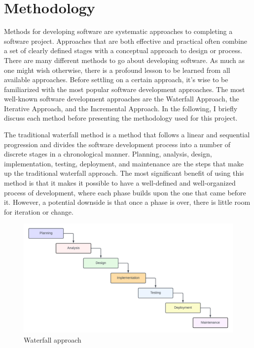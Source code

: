 \chapter{Methodology}

\begin{justify}
Methods for developing software are systematic approaches to completing a software project. Approaches that are both effective and practical often combine a set of clearly defined stages with a conceptual approach to design or process. There are many different methods to go about developing software. As much as one might wish otherwise, there is a profound lesson to be learned from all available approaches. Before settling on a certain approach, it's wise to be familiarized with the most popular software development approaches. The most well-known software development approaches are the Waterfall Approach, the Iterative Approach, and the Incremental Approach. In the following, I briefly discuss each method before presenting the methodology used for this project.

\vspace{0.25cm}
\newendline The traditional waterfall method is a method that follows a linear and sequential progression and divides the software development process into a number of discrete stages in a chronological manner. Planning, analysis, design, implementation, testing, deployment, and maintenance are the steps that make up the traditional waterfall approach. The most significant benefit of using this method is that it makes it possible to have a well-defined and well-organized process of development, where each phase builds upon the one that came before it. However, a potential downside is that once a phase is over, there is little room for iteration or change.

\begin{figure}[H]
    \centerline{\includegraphics[width=140mm,scale=1]{figures/methodology/Waterfall.png}}
    \caption{Waterfall approach}
    \label{Waterfall}
\end{figure}


\end{justify}
